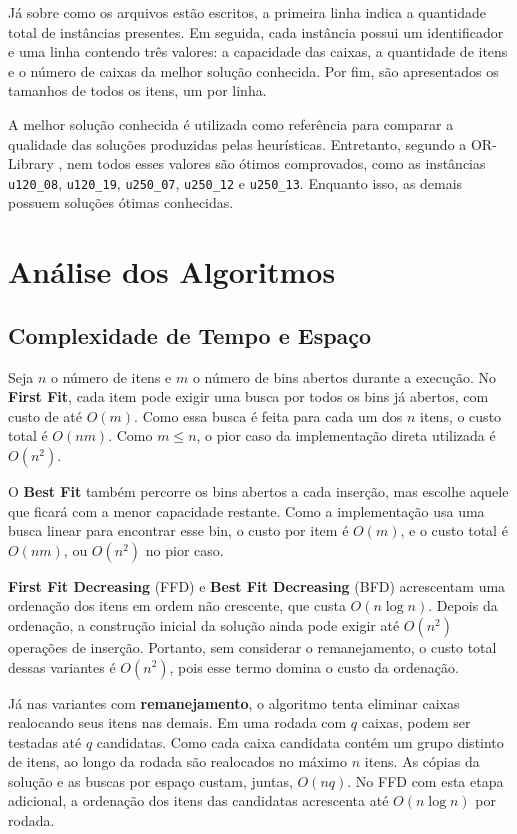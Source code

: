 \documentclass[12pt]{article}
\begin{document}
Já sobre como os arquivos estão escritos, a primeira linha indica a quantidade total de instâncias presentes. Em seguida, cada instância possui um identificador e uma linha contendo três valores: a capacidade das caixas, a quantidade de itens e o número de caixas da melhor solução conhecida. Por fim, são apresentados os tamanhos de todos os itens, um por linha.

A melhor solução conhecida é utilizada como referência para comparar a qualidade das soluções produzidas pelas heurísticas. Entretanto, segundo a OR-Library \cite{orlibrary}, nem todos esses valores são ótimos comprovados, como as instâncias \texttt{u120\_08}, \texttt{u120\_19}, \texttt{u250\_07}, \texttt{u250\_12} e \texttt{u250\_13}. Enquanto isso, as demais possuem soluções ótimas conhecidas.

\section{Análise dos Algoritmos}

\subsection{Complexidade de Tempo e Espaço}
Seja $n$ o número de itens e $m$ o número de bins abertos durante a execução. No \textbf{First Fit}, cada item pode exigir uma busca por todos os bins já abertos, com custo de até $O(m)$. Como essa busca é feita para cada um dos $n$ itens, o custo total é $O(nm)$. Como $m \leq n$, o pior caso da implementação direta utilizada é $O(n^2)$.

O \textbf{Best Fit} também percorre os bins abertos a cada inserção, mas escolhe aquele que ficará com a menor capacidade restante. Como a implementação usa uma busca linear para encontrar esse bin, o custo por item é $O(m)$, e o custo total é $O(nm)$, ou $O(n^2)$ no pior caso.

\textbf{First Fit Decreasing} (FFD) e \textbf{Best Fit Decreasing} (BFD) acrescentam uma ordenação dos itens em ordem não crescente, que custa $O(n\log n)$. Depois da ordenação, a construção inicial da solução ainda pode exigir até $O(n^2)$ operações de inserção. Portanto, sem considerar o remanejamento, o custo total dessas variantes é $O(n^2)$, pois esse termo domina o custo da ordenação.

Já nas variantes com \textbf{remanejamento}, o algoritmo tenta eliminar caixas realocando seus itens nas demais. Em uma rodada com $q$ caixas, podem ser testadas até $q$ candidatas. Como cada caixa candidata contém um grupo distinto de itens, ao longo da rodada são realocados no máximo $n$ itens. As cópias da solução e as buscas por espaço custam, juntas, $O(nq)$. No FFD com esta etapa adicional, a ordenação dos itens das candidatas acrescenta até $O(n\log n)$ por rodada.
\end{document}

